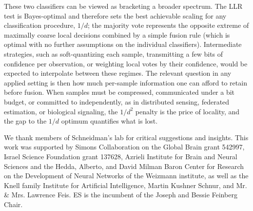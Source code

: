 \documentclass{article}
\begin{document}
These two classifiers can be viewed as bracketing a broader spectrum. The LLR test is Bayes-optimal and therefore sets the best achievable scaling for any classification procedure, $1/d$; the majority vote represents the opposite extreme of maximally coarse local decisions combined by a simple fusion rule (which is optimal with no further assumptions on the individual classifiers). Intermediate strategies, such as soft-quantizing each sample, transmitting a few bits of confidence per observation, or weighting local votes by their confidence, would be expected to interpolate between these regimes. The relevant question in any applied setting is then how much per-sample information one can afford to retain before fusion. When samples must be compressed, communicated under a bit budget, or committed to independently, as in distributed sensing, federated estimation, or biological signaling, the $1/d^{2}$ penalty is the price of locality, and the gap to the $1/d$ optimum quantifies what is lost.

\begin{acknowledgements}
\noindent We thank members of Schneidman’s lab for critical suggestions and insights. This work was supported by Simons Collaboration on the Global Brain grant 542997, Israel Science Foundation grant 137628, Azrieli Institute for Brain and Neural Sciences and the Hedda, Alberto, and David Milman Baron Center for Research on the Development of Neural Networks of the Weizmann institute, as well as the Knell family Institute for Artificial Intelligence, Martin Kushner Schnur, and Mr. \& Mrs. Lawrence Feis. ES is the incumbent of the Joseph and Bessie Feinberg Chair.
\end{acknowledgements}

\printbibliography
\end{document}
